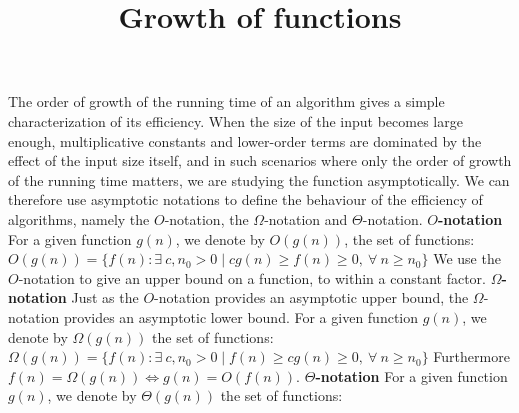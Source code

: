 \documentclass[14pt]{article}
\title{\vspace{-1.0cm}Growth of functions}
\date{}
\begin{document}
\maketitle
\vspace{-2.0cm}
The order of growth of the running time of an algorithm gives a simple characterization of its efficiency. \newline
\hspace*{5mm} When the size of the input becomes large enough, multiplicative constants and lower-order terms are
dominated by the effect of the input size itself, and in such scenarios where only the order of growth of the running
time matters, we are studying the function asymptotically. \newline
\hspace*{5mm} We can therefore use asymptotic notations to define the behaviour of the efficiency of algorithms,
namely the $O$-notation, the $\Omega$-notation and $\Theta$-notation. \newline
\newline
\textbf{$O$-notation} \newline
For a given function $g(n)$, we denote by $O(g(n))$, the set of functions:\vspace{5mm} \newline
$O(g(n)) = \{f(n) : \exists \ c, n_0 > 0 \mid cg(n) \geq f(n) \geq 0, \ \forall \ n \geq n_0\}$ \vspace{5mm} \newline
We use the $O$-notation to give an upper bound on a function, to within a constant factor. \newline \newline
\textbf{$\Omega$-notation} \newline
Just as the $O$-notation provides an asymptotic upper bound, the $\Omega$-notation provides an asymptotic lower bound.
For a given function $g(n)$, we denote by $\Omega(g(n))$ the set of functions: \newline \newline
$\Omega(g(n)) = \{f(n) : \exists \ c, n_0 > 0 \mid f(n) \geq cg(n) \geq 0, \ \forall \ n \geq n_0\}$ \newline \newline
Furthermore $f(n) = \Omega(g(n)) \iff g(n) = O(f(n)).$ \newline \newline
\textbf{$\Theta$-notation} \newline
For a given function $g(n)$, we denote by $\Theta(g(n))$ the set of functions: \newline \newline
\end{document}
